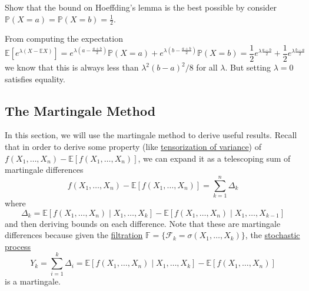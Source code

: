   \begin{exercise}
  Show that the bound on Hoeffding's lemma is the best possible by consider $\mathbb{P}(X = a) = \mathbb{P}(X = b) = \frac{1}{2}$. 
  \end{exercise}
  \begin{solution}
  From computing the expectation 
  \begin{equation}
    \mathbb{E}[ e^{\lambda (X - \mathbb{E} X)}] = e^{\lambda (a - \frac{a + b}{2})} \mathbb{P}(X = a) + e^{\lambda (b - \frac{a + b}{2})} \mathbb{P}(X = b) = \frac{1}{2} e^{ \lambda \frac{a - b}{2}} + \frac{1}{2} e^{\lambda \frac{b - a}{2}}
  \end{equation}
  we know that this is always less than $\lambda^2 (b - a)^2/ 8$ for all $\lambda$. But setting $\lambda = 0$ satisfies equality. 
  \end{solution}

\subsection{The Martingale Method}

  In this section, we will use the martingale method to derive useful results. Recall that in order to derive some property (like \hyperref[thm:tensorization-of-variance]{tensorization of variance}) of $f(X_1, \ldots, X_n) - \mathbb{E}[f(X_1, \ldots, X_n)]$, we can expand it as a telescoping sum of martingale differences 
  \begin{equation}
    f(X_1, \ldots, X_n) - \mathbb{E}[f(X_1, \ldots, X_n)] = \sum_{k=1}^n \Delta_k
  \end{equation}
  where 
  \begin{equation}
    \Delta_k = \mathbb{E}[f(X_1, \ldots, X_n) \mid X_1, \ldots, X_k] - \mathbb{E}[f(X_1, \ldots, X_n) \mid X_1, \ldots, X_{k-1}]
  \end{equation}
  and then deriving bounds on each difference. Note that these are martingale differences because given the \hyperref[sp-def:filtration]{filtration} $\mathbb{F} = \{\mathcal{F}_k = \sigma(X_1, \ldots, X_k)\}$, the \hyperref[sp-def:stochastic-process]{stochastic process}
  \begin{equation}
    Y_k = \sum_{i=1}^k \Delta_i = \mathbb{E}[f(X_1, \ldots, X_n) \mid X_1, \ldots, X_k] - \mathbb{E}[f(X_1, \ldots, X_n)]
  \end{equation}
  is a martingale. 


